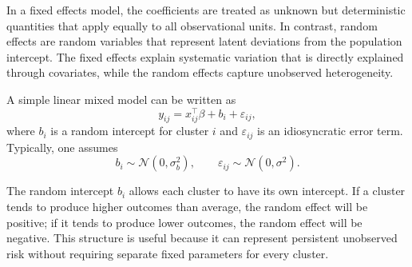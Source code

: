 \documentclass{sfuthesis}
\numberwithin{equation}{chapter}
\begin{document}
In a fixed effects model, the coefficients are treated as unknown but deterministic quantities that apply equally to all observational units. In contrast, random effects are random variables that represent latent deviations from the population intercept. The fixed effects explain systematic variation that is directly explained through covariates, while the random effects capture unobserved heterogeneity. 

A simple linear mixed model can be written as
\begin{equation}
    y_{ij} = x_{ij}^\top \beta + b_i + \varepsilon_{ij},
    \label{eq:lmm}
\end{equation}
where $b_i$ is a random intercept for cluster $i$ and $\varepsilon_{ij}$ is an idiosyncratic error term. Typically, one assumes
\begin{equation}
    b_i \sim \mathcal{N}(0,\sigma_b^2),
    \qquad
    \varepsilon_{ij} \sim \mathcal{N}(0,\sigma^2).
\end{equation}

The random intercept $b_i$ allows each cluster to have its own intercept. If a cluster tends to produce higher outcomes than average, the random effect will be positive; if it tends to produce lower outcomes, the random effect will be negative. This structure is useful because it can represent persistent unobserved risk without requiring separate fixed parameters for every cluster.


\end{document}

